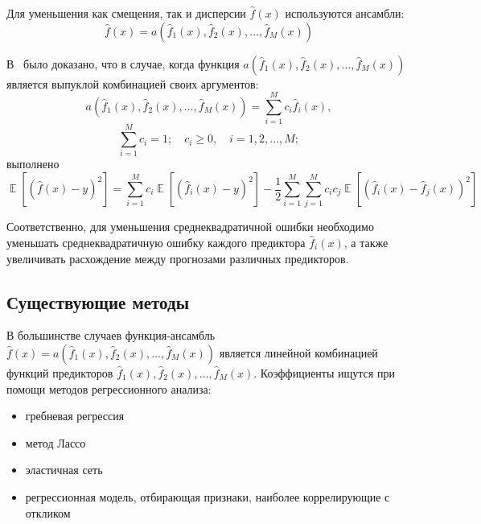 \documentclass[12pt, fleqn]{article}
\newcommand{\expectation}{\mathop{\mathbb{E}}}
\newcommand{\predictionfunction}{\hat{f}}
\newcommand{\ensemblefunction}{a}
\newcommand{\numberpredictionfunctions}{M}
\newcommand{\for}[3]{\sum\limits_{#1 = #2}^{#3}}  %
\newcommand{\forn}[2]{\for{#1}{1}{#2}}  %
\newcommand{\many}[3]{#1 1 #2, #1 2 #2, \dots, #1 #3 #2}  %
\newcommand{\ensemblefunctionfull}{\ensemblefunction(\many{\predictionfunction_}{(x)}{\numberpredictionfunctions})}
\begin{document}
Для уменьшения как смещения, так и дисперсии $\predictionfunction(x)$ используются ансамбли:
\begin{equation*}
\predictionfunction(x) = \ensemblefunctionfull
\end{equation*}

В~\cite{OptimalConvexCorrectingProcedures} было доказано, что в случае, когда функция $\ensemblefunctionfull$ является выпуклой комбинацией своих аргументов:
\begin{equation*}
\ensemblefunctionfull = 
\forn{i}{\numberpredictionfunctions} c_i \predictionfunction_i(x),
\end{equation*}
\begin{equation*}
\forn{i}{\numberpredictionfunctions} c_i = 1; \quad c_i \geq 0, \quad i = \many{}{}{\numberpredictionfunctions};
\end{equation*}
выполнено
\begin{equation}\label{OptimizedDifferenceDecomposition}
\expectation \left[\left( \predictionfunction(x) - y \right)^2 \right] =
\forn{i}{\numberpredictionfunctions} c_i
\expectation \left[ \left(
	\predictionfunction_i(x) - y
\right)^2 \right] 
- \dfrac{1}{2}
\forn{i}{\numberpredictionfunctions} \forn{j}{\numberpredictionfunctions} c_i c_j
\expectation \left[ \left(
	\predictionfunction_i(x) - \predictionfunction_j(x)
\right)^2 \right]
\end{equation}

Соответственно, для уменьшения среднеквадратичной ошибки необходимо уменьшать среднеквадратичную ошибку каждого предиктора $\predictionfunction_i(x)$, а также увеличивать расхождение между прогнозами различных предикторов.

\subsection{Существующие методы}

В большинстве случаев функция-ансамбль $\predictionfunction(x) = \ensemblefunctionfull$ является линейной комбинацией функций предикторов $\many{\predictionfunction_}{(x)}{\numberpredictionfunctions}$. Коэффициенты ищутся при помощи методов регрессионного анализа:
\begin{itemize}
\item гребневая регрессия~\cite{Ridge}
\item метод Лассо~\cite{Lasso}
\item эластичная сеть~\cite{ElasticNet}
\item регрессионная модель, отбирающая признаки, наиболее коррелирующие с откликом~\cite{ConvexCombinationsBestCorrelatedWithResponse}
\end{itemize}
\end{document}
